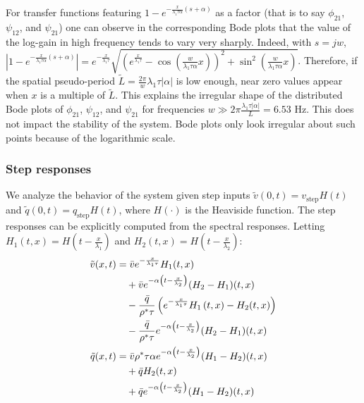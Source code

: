 \documentclass[5p,twocolumn]{elsarticle}
\begin{document}
For transfer functions featuring $1 - e^{-\frac{x}{\lambda_{1} \tau \alpha} \left(s + \alpha \right)}$ as a factor (that is to say $\phi_{21}$, $\psi_{12}$, and $\psi_{21}$) one can observe in the corresponding Bode plots that the value of the log-gain in high frequency tends to vary very sharply. Indeed, with $s = jw$,
$
\left| 
	1 - e^{-\frac{x}{\lambda_{1} \tau \alpha} \left(s + \alpha\right)}
\right| = 
e^{-\frac{x}{\lambda_{1} \tau}}
\sqrt{
	\left(
		e^{\frac{x}{\lambda_{1}\tau}} 
		-
		\cos\left(\frac{w}{\lambda_{1} \tau \alpha} x\right)
	\right)^{2}
	+
	\sin^{2}\left( \frac{w}{\lambda_{1} \tau \alpha} x \right)
}
$. Therefore, if the spatial pseudo-period $\tilde{L}=\frac{2\pi}{w} \lambda_{1} \tau \left|\alpha\right|$ is low enough, near zero values appear when $x$ is a multiple of $\tilde{L}$. This explains the irregular shape of the distributed Bode plots of $\phi_{21}$, $\psi_{12}$, and $\psi_{21}$ for frequencies $w \gg 2 \pi \frac{\lambda_{1} \tau \left|\alpha\right|}{L} = 6.53$ Hz. This does not impact the stability of the system. Bode plots only look irregular about such points because of the logarithmic scale.

\subsubsection{Step responses}
We analyze the behavior of the system given step inputs $\tilde{v}(0,t)=v_{\text{step}}H(t)$ and $\tilde{q}(0,t)=q_{\text{step}}H(t)$, where $H(\cdot)$ is the Heaviside function. The step responses can be explicitly computed from the spectral responses. Letting $H_1(t,x) = H\left(t-\frac{x}{\lambda_{1}}\right)$ and
$H_2(t,x) = H\left(t - \frac{x}{\lambda_{2}} \right)$:
\begin{align}
\tilde{v}(x,t) &= 
\bar{v}
e^{-\frac{x}{\lambda_{1}\tau}}H_1(t,x)
\notag\\
&\quad
+\bar{v}
e^{-\alpha \left(t - \frac{x}{\lambda_{2}} \right)}
	(H_2 - H_1)(t,x)
\notag \\
&\quad
- \dfrac{\bar{q}}{\rho^* \tau}
\left(
	e^{-\frac{x}{\lambda_{1}\tau}}H_1\left(t,x\right) 
	- H_2(t,x)
\right) 
\notag\\
&\quad
- \dfrac{\bar{q}}{\rho^* \tau} e^{-\alpha \left(t - \frac{x}{\lambda_{2}} \right)}
	(H_2 - H_1)(t,x)\\
\tilde{q}(x,t) &= \bar{v} \rho^*\tau \alpha e^{-\alpha \left(t - \frac{x}{\lambda_{2}} \right)}
	(H_1 - H_2)(t,x)
\notag \\
&\quad+ 
\bar{q}
H_2(t,x)
\notag\\
&\quad
+
\bar{q}
e^{-\alpha \left(t - \frac{x}{\lambda_{2}} \right)}
	(H_1 - H_2)(t,x)	
\end{align}
\end{document}
